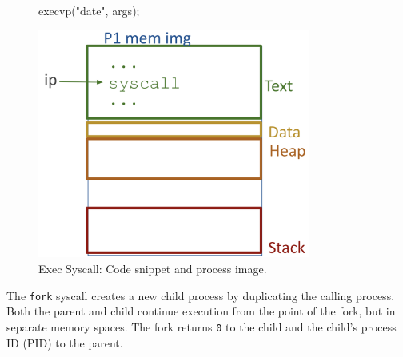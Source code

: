 \begin{figure}[htp]
  \centering
  \begin{minipage}[b]{0.45\textwidth}
    \begin{cc}
execvp("date", args);











    \end{cc}
  \end{minipage}
  \hfill
  \vline
  \hfill
  \begin{minipage}[b]{0.45\textwidth}
    \centering
    \includegraphics[width=0.8\textwidth]{chapters/L3/images/exec.png}
  \end{minipage}
  \caption{Exec Syscall: Code snippet and process image.}
\end{figure}

\begin{definition}
The \texttt{fork} syscall creates a new child process by duplicating the calling process. Both the parent and child continue execution from the point of the fork, but in separate memory spaces. The fork returns \texttt{0} to the child and the child's process ID (PID) to the parent.
\end{definition}

